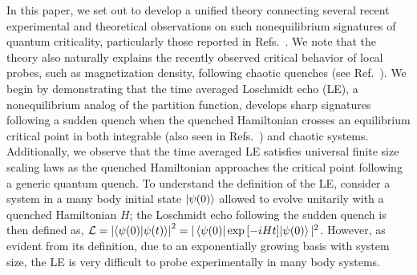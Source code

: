 \documentclass[aps,prx,twocolumn]{revtex4-2}
\begin{document}
In this paper, we set out to develop a unified theory connecting several recent experimental and theoretical observations on such nonequilibrium signatures of quantum criticality, particularly those reported in Refs.~\cite{Zhang2017,asmi21}. We note that the theory also naturally explains the recently observed critical behavior of local probes, such as magnetization density, following chaotic quenches (see Ref.~\cite{ettore20,halimeh21}). We begin by demonstrating that the time averaged Loschmidt echo (LE), a nonequilibrium analog of the partition function,  {develops sharp signatures following a sudden quench when the quenched Hamiltonian crosses an equilibrium critical point in both integrable (also seen in Refs.~\cite{schmitt15,zhou19}) and chaotic systems.} Additionally, we observe that the time averaged LE satisfies universal finite size scaling laws as the quenched Hamiltonian approaches the critical point following a generic quantum quench. To understand the definition of the LE, consider a system in a many body initial state $\ket{\psi(0)}$ allowed to evolve unitarily with a quenched Hamiltonian $H$; the Loschmidt echo following the sudden quench is then defined as, $\mathcal{L}=\left|\braket{\psi(0)|\psi(t)}\right|^2=|\braket{\psi(0)|\exp{[-iHt]}|\psi(0)}|^2$. However, as evident from its definition, due to an exponentially growing basis with system size, the LE is very difficult to probe experimentally in many body systems.\\
\end{document}
